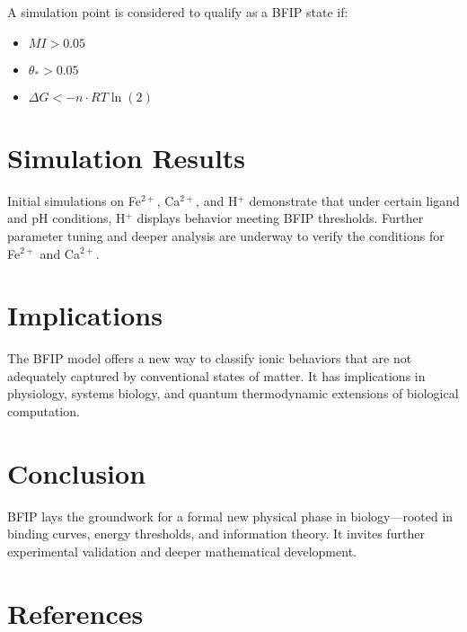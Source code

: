 \documentclass[11pt]{article}
\begin{document}
A simulation point is considered to qualify as a BFIP state if:

\begin{itemize}
    \item $MI > 0.05$
    \item $\theta_* > 0.05$
    \item $\Delta G < -n \cdot RT \ln(2)$
\end{itemize}

\section{Simulation Results}

Initial simulations on Fe$^{2+}$, Ca$^{2+}$, and H$^+$ demonstrate that under certain ligand and pH conditions, H$^+$ displays behavior meeting BFIP thresholds. Further parameter tuning and deeper analysis are underway to verify the conditions for Fe$^{2+}$ and Ca$^{2+}$.

\section{Implications}

The BFIP model offers a new way to classify ionic behaviors that are not adequately captured by conventional states of matter. It has implications in physiology, systems biology, and quantum thermodynamic extensions of biological computation.

\section{Conclusion}

BFIP lays the groundwork for a formal new physical phase in biology—rooted in binding curves, energy thresholds, and information theory. It invites further experimental validation and deeper mathematical development.

\section*{References}



\end{document}
